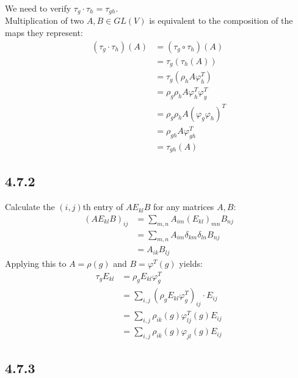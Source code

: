 \documentclass[12pt]{article}
\begin{document}
We need to verify $\tau_g \cdot \tau_h = \tau_{gh}$.\\
Multiplication of two $A,B \in GL(V)$ is equivalent to the composition of the maps they represent:
\begin{equation*}
    \begin{split}
        (\tau_g \cdot \tau_h) (A) &= (\tau_g \circ \tau_h) (A)\\
        &= \tau_g (\tau_h (A))\\
        &= \tau_g (\rho_h A \varphi_h^T)\\
        &= \rho_g \rho_h A \varphi_h^T \varphi_g^T\\
        &= \rho_g \rho_h A (\varphi_g \varphi_h)^T\\
        &= \rho_{gh} A \varphi_{gh}^T\\
        &= \tau_{gh} (A)
    \end{split}
\end{equation*}

\subsection*{4.7.2}

Calculate the $(i,j)$th entry of $A E_{kl} B$ for any matrices $A,B$:
\begin{equation*}
    \begin{split}
        (A E_{kl} B)_{ij} &= \sum_{m,n} A_{im} (E_{kl})_{mn} B_{nj}\\
        &= \sum_{m,n} A_{im} \delta_{km} \delta_{ln} B_{nj}\\
        &= A_{ik} B_{lj}
    \end{split}
\end{equation*}
Applying this to $A=\rho(g)$ and $B=\varphi^T(g)$ yields:
\begin{equation*}
    \begin{split}
        \tau_g E_{kl} &= \rho_g E_{kl} \varphi_g^T\\
        &= \sum_{i,j} (\rho_g E_{kl} \varphi_g^T)_{ij} \cdot E_{ij}\\
        &= \sum_{i,j} \rho_{ik}(g) \varphi_{lj}^T(g) E_{ij}\\
        &= \sum_{i,j} \rho_{ik}(g) \varphi_{jl}(g) E_{ij}
    \end{split}
\end{equation*}

\subsection*{4.7.3}
\end{document}
